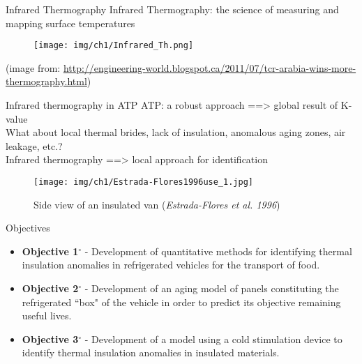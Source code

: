 \begin{frame}{Infrared Thermography}
    \footnotesize{Infrared Thermography: the science of measuring and mapping surface temperatures}
        \begin{figure}
            \texttt{[image: img/ch1/Infrared\_Th.png]}
        \end{figure}
        \scriptsize{(image from: \hyperlink{Engineering World}{http://engineering-world.blogspot.ca/2011/07/tcr-arabia-wins-more-thermography.html})}
\end{frame}



\begin{frame}{Infrared thermography in ATP}
\small
ATP: a robust approach ==> \alert{global} result of K-value\\
\pause
What about local thermal brides, lack of insulation, anomalous aging zones, air leakage, etc.?\\
\pause
Infrared thermography ==> \alert{local} approach for identification
\pause
    \begin{figure}
        \centering
        \texttt{[image: img/ch1/Estrada-Flores1996use\_1.jpg]}
        \caption{Side view of an insulated van (\textit{Estrada-Flores et al. 1996})}
    \end{figure}
\end{frame}


\begin{frame}{Objectives}
    \begin{itemize}
        \item \textbf{Objective 1$ ^\circ $ } - Development of quantitative methods for identifying thermal insulation anomalies in refrigerated vehicles for the transport of food.
        \item \textbf{Objective 2$ ^\circ $ } - Development of an aging model of panels constituting the refrigerated ``box" of the vehicle in order to predict its objective remaining useful lives. 
        \item \textbf{Objective 3$ ^\circ $ } - Development of a model using a cold stimulation device to identify thermal insulation anomalies in insulated materials.
    \end{itemize}
\end{frame}
